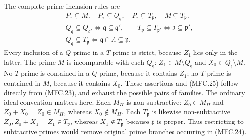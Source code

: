 The complete prime inclusion rules are
\[
 \begin{aligned}
 &P_\tau\subsetneq M,\quad
 P_\tau\subsetneq Q_{\mathfrak q},\quad
 P_\tau\subsetneq T_{\mathfrak p},\quad
 M\subsetneq T_{\mathfrak p},\\
 &Q_{\mathfrak q}\subseteq Q_{\mathfrak q'}
       \iff\mathfrak q\subseteq\mathfrak q',\qquad
 T_{\mathfrak p}\subseteq T_{\mathfrak p'}
       \iff\mathfrak p\subseteq\mathfrak p',\\
 &Q_{\mathfrak q}\subseteq T_{\mathfrak p}
       \iff\mathfrak q\cap A\subseteq\mathfrak p .
 \end{aligned}                                           \tag{MFC.25}
\]
Every inclusion of a \(Q\)-prime in a \(T\)-prime is strict,
because \(Z_1\) lies only in the latter.
The prime \(M\) is incomparable with each \(Q_{\mathfrak q}\):
\(Z_1\in M\setminus Q_{\mathfrak q}\) and
\(X_0\in Q_{\mathfrak q}\setminus M\).
No \(T\)-prime is contained in a \(Q\)-prime, because it contains
\(Z_1\); no \(T\)-prime is contained in \(M\), because it contains
\(X_0\). These assertions and (MFC.25) follow directly from
(MFC.23), and exhaust the possible pairs of families.
The ordinary ideal convention matters here. Each \(M_H\)
is non-subtractive: \(Z_0\in M_H\) and
\(Z_0+X_0=Z_0\in M_H\), whereas \(X_0\notin M_H\).
Each \(T_{\mathfrak p}\) is likewise non-subtractive:
\(Z_0,Z_0+X_1=Z_1\in T_{\mathfrak p}\), whereas
\(X_1\notin T_{\mathfrak p}\) because \(\mathfrak p\) is proper.
Thus restricting to subtractive primes would remove
original prime branches occurring in (MFC.24).

